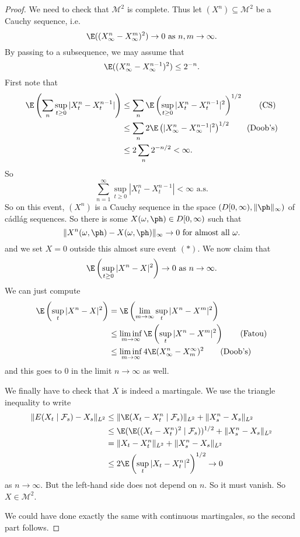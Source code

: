 \documentclass[a4paper]{article}
\begin{document}
\begin{proof}
  We need to check that $\mathcal{M}^2$ is complete. Thus let $(X^n) \subseteq \mathcal{M}^2$ be a Cauchy sequence, i.e.
  \[
    \E((X_\infty^n - X_\infty^m)^2) \to 0\text{ as }n, m \to \infty.
  \]
  By passing to a subsequence, we may assume that
  \[
    \E((X_\infty^n - X_{\infty}^{n - 1})^2) \leq 2^{-n}.
  \]
  First note that
  \begin{align*}
    \E\left(\sum_n \sup_{t \geq 0} |X_t^n - X_t^{n - 1}|\right) &\leq \sum_n \E \left(\sup_{t \geq 0} |X_t^n - X_t^{n - 1}|^2 \right)^{1/2}\tag{CS}\\
    &\leq \sum_n 2 \E \left(|X_\infty^n - X_\infty^{n - 1}|^2\right)^{1/2}\tag{Doob's}\\
    &\leq 2 \sum_n 2^{-n/2} < \infty.
  \end{align*}
  So
  \[
    \sum_{n = 1}^\infty \sup_{t \geq 0} |X_t^n - X_t^{n - 1}|< \infty\text{ a.s.}\tag{$*$}
  \]
  So on this event, $(X^n)$ is a Cauchy sequence in the space $(D[0, \infty), \|\ph\|_\infty)$ of c\'adl\'ag sequences. So there is some $X(\omega, \ph) \in D[0, \infty)$ such that
  \[
    \|X^n (\omega, \ph) - X(\omega, \ph)\|_\infty \to 0\text{ for almost all }\omega.
  \]
  and we set $X = 0$ outside this almost sure event $(*)$. We now claim that
  \[
    \E \left(\sup_{t \geq 0} |X^n - X|^2\right) \to 0\text{ as }n \to \infty.
  \]
  We can just compute
  \begin{align*}
    \E \left(\sup_t |X^n - X|^2\right) &= \E \left(\lim_{m \to \infty} \sup_t |X^n - X^m|^2\right)\\
    &\leq \liminf_{m \to \infty} \E\left(\sup_t |X^n - X^m|^2\right) \tag{Fatou}\\
    &\leq \liminf_{m \to \infty} 4 \E (X^n_\infty - X_m^\infty)^2 \tag{Doob's}
  \end{align*}
  and this goes to $0$ in the limit $n \to \infty$ as well.

  We finally have to check that $X$ is indeed a martingale. We use the triangle inequality to write
  \begin{align*}
    \|E(X_t \mid \mathcal{F}_s) - X_s \|_{L^2} &\leq \|\E (X_t - X_t^n \mid \mathcal{F}_s)\|_{L^2} + \|X_s^n - X_s\|_{L^2}\\
    &\leq \E (\E ((X_t - X_t^n)^2 \mid \mathcal{F}_s))^{1/2} + \|X_s^n - X_s\|_{L^2}\\
    &= \|X_t - X_t^n\|_{L^2} + \|X_s^n - X_s\|_{L^2}\\
    &\leq 2 \E\left(\sup_t |X_t - X_t^n|^2\right)^{1/2} \to 0
  \end{align*}
  as $n \to \infty$. But the left-hand side does not depend on $n$. So it must vanish. So $X \in \mathcal{M}^2$.

  We could have done exactly the same with continuous martingales, so the second part follows.
\end{proof}
\end{document}
